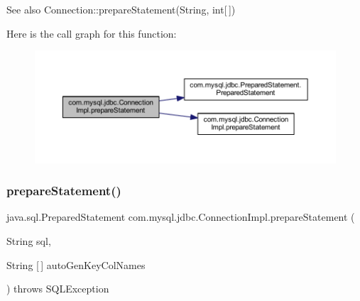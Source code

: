 \begin{DoxySeeAlso}{See also}
Connection\+::prepare\+Statement(\+String, int\mbox{[}$\,$\mbox{]}) 
\end{DoxySeeAlso}
Here is the call graph for this function\+:\nopagebreak
\begin{figure}[H]
\begin{center}
\leavevmode
\includegraphics[width=350pt]{classcom_1_1mysql_1_1jdbc_1_1_connection_impl_a16bfd377059377ad90fe6ea2a3e2edc8_cgraph}
\end{center}
\end{figure}
\mbox{\label{classcom_1_1mysql_1_1jdbc_1_1_connection_impl_a5aeafc10ae08b207b24a7b0e782410e4}} 
\subsubsection{\texorpdfstring{prepare\+Statement()}{prepareStatement()}\hspace{0.1cm}{\footnotesize\ttfamily [6/6]}}
{\footnotesize\ttfamily java.\+sql.\+Prepared\+Statement com.\+mysql.\+jdbc.\+Connection\+Impl.\+prepare\+Statement (\begin{DoxyParamCaption}\item[{String}]{sql,  }\item[{String \mbox{[}$\,$\mbox{]}}]{auto\+Gen\+Key\+Col\+Names }\end{DoxyParamCaption}) throws S\+Q\+L\+Exception}

